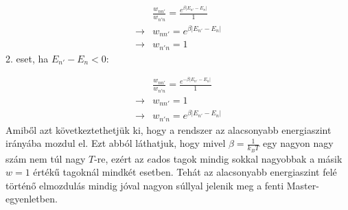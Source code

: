 \begin{align}
    &\frac{w_{nn'}}{w_{n'n}}
    =
    \frac{e^{\beta \left| E_{n'} - E_{n} \right|}}{1} \nonumber \\
    \to&
    w_{nn'} = e^{\beta \left| E_{n'} - E_{n} \right|} \\
    \to&
    w_{n'n} = 1
\end{align}
2. eset, ha $E_{n'} - E_{n} < 0$:

\begin{align}
    &\frac{w_{nn'}}{w_{n'n}}
    =
    \frac{e^{- \beta \left| E_{n'} - E_{n} \right|}}{1} \nonumber \\
    \to&
    w_{nn'} = 1 \\
    \to&
    w_{n'n} = e^{\beta \left| E_{n'} - E_{n} \right|}
\end{align}
Amiből azt következtethetjük ki, hogy a rendszer az alacsonyabb energiaszint irányába mozdul el. Ezt abból láthatjuk, hogy mivel $\beta = \frac{1}{k_{B} T}$ egy nagyon nagy szám nem túl nagy $T$-re, ezért az $e$ados tagok mindig sokkal nagyobbak a másik $w = 1$ értékű tagoknál mindkét esetben. Tehát az alacsonyabb energiaszint felé történő elmozdulás mindig jóval nagyon súllyal jelenik meg a fenti Master-egyenletben.